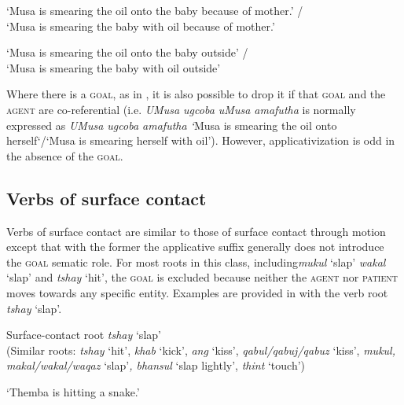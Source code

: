 \documentclass[output=paper]{langsci/langscibook}
\begin{document}
\glt ‘Musa is smearing the oil onto the baby because of mother.’ /\\
 ‘Musa is smearing the baby with oil because of mother.’


\glt ‘Musa is smearing the oil onto the baby outside’ / \\
‘Musa is smearing the baby with oil outside’ 
\z
\z

Where there is a \textsc{goal,} as in , it is also possible to drop it if that \textsc{goal} and the \textsc{agent} are co-referential (i.e. \textit{UMusa ugcoba uMusa amafutha} is normally expressed as \textit{UMusa ugcoba amafutha ‘}Musa is smearing the oil onto herself‘/‘Musa is smearing herself with oil’). However, applicativization is odd in the absence of the \textsc{goal.}

\subsection{Verbs of surface contact}\label{sec:sibanda:4.3}

Verbs of surface contact are similar to those of surface contact through motion except that with the former the applicative suffix generally does not introduce the \textsc{goal} sematic role. For most roots in this class, including\textit {mukul} ‘slap’ \textit{wakal} ‘slap’ and \textit{tshay} ‘hit’, the \textsc{goal} is excluded because neither the \textsc{agent} nor \textsc{patient} moves towards any specific entity. Examples are provided in  with the verb root \textit{tshay} ‘slap’.

\ea\label{ex:sibanda:11}
\settowidth{}
{Surface-contact root \textit {tshay} ‘slap’} \\
 (Similar roots: \textit{tshay} ‘hit’, \textit{khab} ‘kick’, \textit{ang} ‘kiss’, \textit{qabul/qabuj/qabuz} ‘kiss’, \textit{mukul, makal/wakal/waqaz} ‘slap’\textit{, bhansul} ‘slap lightly’, \textit{thint} ‘touch’)\\

\glt ‘Themba is hitting a snake.’
\end{document}
